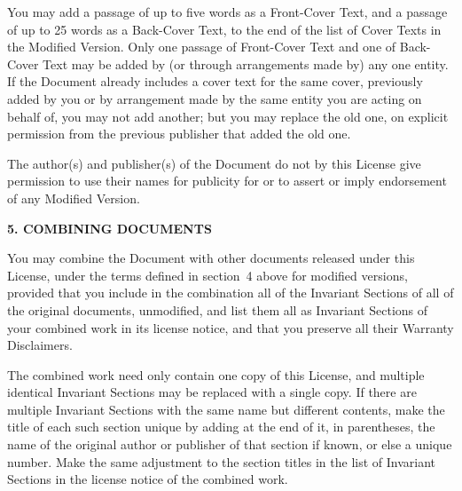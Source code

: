 \ifdefined\chs

\fi

\ifdefined\eng
You may add a passage of up to five words as a Front-Cover Text, and a
passage of up to 25 words as a Back-Cover Text, to the end of the list
of Cover Texts in the Modified Version.  Only one passage of
Front-Cover Text and one of Back-Cover Text may be added by (or
through arrangements made by) any one entity.  If the Document already
includes a cover text for the same cover, previously added by you or
by arrangement made by the same entity you are acting on behalf of,
you may not add another; but you may replace the old one, on explicit
permission from the previous publisher that added the old one.
\fi

\ifdefined\chs

\fi

\ifdefined\eng
The author(s) and publisher(s) of the Document do not by this License
give permission to use their names for publicity for or to assert or
imply endorsement of any Modified Version.
\fi

\ifdefined\chs

\fi

\ifdefined\eng
\pagebreak
\begin{center}
{\Large\bf 5. COMBINING DOCUMENTS\par}
\end{center}
\fi

\ifdefined\chs

\fi

\ifdefined\eng
\fi

\ifdefined\chs

\fi

\ifdefined\eng
You may combine the Document with other documents released under this
License, under the terms defined in section~4 above for modified
versions, provided that you include in the combination all of the
Invariant Sections of all of the original documents, unmodified, and
list them all as Invariant Sections of your combined work in its
license notice, and that you preserve all their Warranty Disclaimers.
\fi

\ifdefined\chs

\fi

\ifdefined\eng
The combined work need only contain one copy of this License, and
multiple identical Invariant Sections may be replaced with a single
copy.  If there are multiple Invariant Sections with the same name but
different contents, make the title of each such section unique by
adding at the end of it, in parentheses, the name of the original
author or publisher of that section if known, or else a unique number.
Make the same adjustment to the section titles in the list of
Invariant Sections in the license notice of the combined work.
\fi


